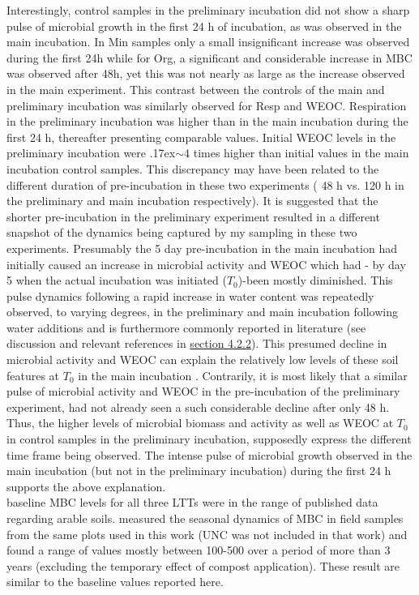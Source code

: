 	Interestingly, control samples in the preliminary incubation did not show a sharp pulse of microbial growth in the first 24 h of incubation, as was observed in the main incubation. In Min samples only a small insignificant increase was observed during the first 24h while for Org, a significant and considerable increase in MBC was observed after 48h, yet this was  not nearly as large as the increase observed in the main experiment. This contrast between the controls of the main and preliminary incubation was similarly observed for Resp and WEOC. Respiration in the preliminary incubation was higher than in the main incubation during the first 24 h, thereafter presenting comparable values. Initial WEOC levels in the preliminary incubation were {\raise.17ex\hbox{$\scriptstyle\mathtt{\sim}$}}4 times higher than initial values in the main incubation control samples. This discrepancy may have been related to the different duration of pre-incubation in these two experiments ( 48 h vs. 120 h in the preliminary and main incubation respectively). It is suggested that the shorter pre-incubation in the preliminary experiment resulted in a different snapshot of the dynamics being captured by my sampling in these two experiments. Presumably the 5 day pre-incubation in the main incubation had initially caused an increase in microbial activity and WEOC which had - by day 5 when the actual incubation was initiated ($ T_0 $)-been mostly diminished. This pulse dynamics following a rapid increase in water content was repeatedly observed, to varying degrees, in the preliminary and main incubation following water additions and is furthermore commonly reported in literature (see discussion and relevant references in  \hyperref[subsection_4.2.2]{section 4.2.2}). This presumed decline in microbial activity and WEOC can explain the relatively low levels of these soil features at $ T_0 $ in the main incubation . Contrarily, it is most likely that a similar pulse of microbial activity and WEOC in the pre-incubation of the preliminary experiment, had not already seen a such considerable decline after only 48 h. Thus, the higher levels of microbial biomass and activity as well as WEOC at $ T_0 $ in control samples in the preliminary incubation, supposedly express the different time frame being observed. The intense pulse of microbial growth observed in the main incubation (but not in the preliminary incubation) during the first 24 h supports the above explanation.\\
	baseline MBC levels for all three LTTs were in the range of published data regarding arable soils\citep{gonzalez-quinones2011}. \citet{rotbart2018} measured the seasonal dynamics of MBC in field samples from the same plots used in this work (UNC was not included in that work) and found a range of values mostly between 100-500 \genericunit over a period of more than 3 years (excluding the temporary effect of compost application). These result are similar to the baseline values reported here.

